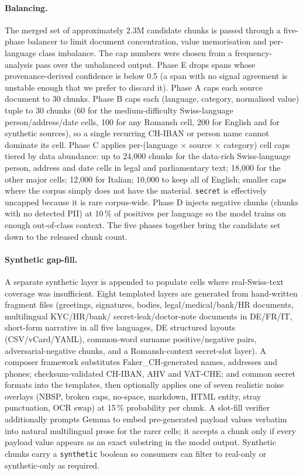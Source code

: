 \documentclass[sigconf,nonacm]{acmart}
\begin{document}
\paragraph{Balancing.} The merged set of approximately 2.3M
candidate chunks is passed through a five-phase balancer to limit
document concentration, value memorisation and per-language class
imbalance. The cap numbers were chosen from a frequency-analysis
pass over the unbalanced output. Phase E drops spans whose
provenance-derived confidence is below 0.5 (a span with no signal
agreement is unstable enough that we prefer to discard it).
Phase A caps each source document to 30 chunks. Phase B caps each
(language, category, normalised value) tuple to 30 chunks (60 for
the medium-difficulty Swiss-language person/address/date cells,
100 for any Romansh cell, 200 for English and for synthetic
sources), so a single recurring CH-IBAN or person name cannot
dominate its cell. Phase C applies per-(language $\times$ source
$\times$ category) cell caps tiered by data abundance: up to
24{,}000 chunks for the data-rich Swiss-language person, address
and date cells in legal and parliamentary text; 18{,}000 for the
other major cells; 12{,}000 for Italian; 10{,}000 to keep all of
English; smaller caps where the corpus simply does not have the
material. \texttt{secret} is effectively uncapped because it is
rare corpus-wide. Phase D injects negative chunks (chunks with no
detected PII) at 10\,\% of positives per language so the model
trains on enough out-of-class context. The five phases together
bring the candidate set down to the released chunk count.

\paragraph{Synthetic gap-fill.} A separate synthetic layer is
appended to populate cells where real-Swiss-text coverage was
insufficient. Eight templated layers are generated from
hand-written fragment files (greetings, signatures, bodies,
legal/medical/bank/HR documents, multilingual KYC/HR/bank/
secret-leak/doctor-note documents in DE/FR/IT, short-form
narrative in all five languages, DE structured layouts
(CSV/vCard/YAML), common-word surname positive/negative pairs,
adversarial-negative chunks, and a Romansh-context secret-slot
layer). A composer framework substitutes Faker\_CH-generated names,
addresses and phones; checksum-validated CH-IBAN, AHV and VAT-CHE;
and common secret formats into the templates, then optionally
applies one of seven realistic noise overlays (NBSP, broken caps,
no-space, markdown, HTML entity, stray punctuation, OCR swap) at
15\,\% probability per chunk. A slot-fill verifier additionally
prompts Gemma to embed pre-generated payload values verbatim into
natural multilingual prose for the rarer cells; it accepts a chunk
only if every payload value appears as an exact substring in the
model output. Synthetic chunks carry a \texttt{synthetic} boolean
so consumers can filter to real-only or synthetic-only as
required.
\end{document}
